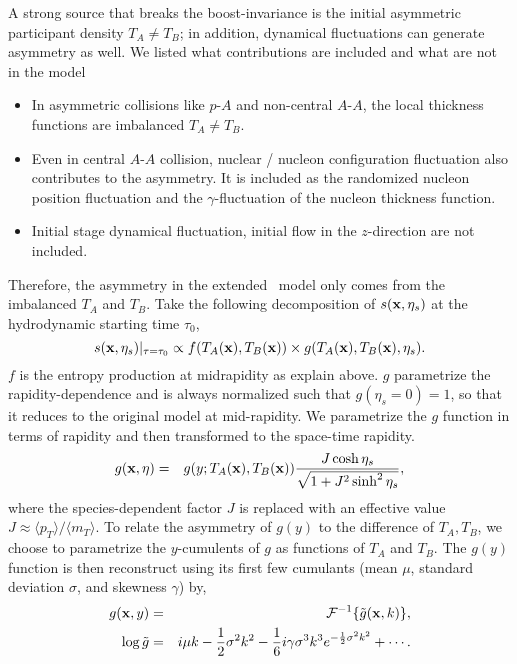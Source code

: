 A strong source that breaks the boost-invariance is the initial asymmetric participant density $T_A \neq T_B$; in addition, dynamical fluctuations can generate asymmetry as well.
We listed what contributions are included and what are not in the model
\begin{itemize}
\item In asymmetric collisions like $p$-$A$ and non-central $A$-$A$, the local thickness functions are imbalanced $T_A \neq T_B$.
\item Even in central $A$-$A$ collision, nuclear / nucleon configuration fluctuation also contributes to the asymmetry. It is included as the randomized nucleon position fluctuation and the $\gamma$-fluctuation of the nucleon thickness function.
\item Initial stage dynamical fluctuation, initial flow in the $z$-direction are not included.
\end{itemize}
Therefore, the asymmetry in the extended \trento\ model only comes from the imbalanced $T_A$ and $T_B$.
Take the following decomposition of $s(\mathbf x, \eta_s)$ at the hydrodynamic starting time $\tau_0$,
\begin{equation}
  s(\mathbf x, \eta_s)\vert_{\tau=\tau_0} \propto f(T_A(\mathbf x), T_B(\mathbf x)) \times g(T_A(\mathbf x), T_B(\mathbf x), \eta_s).
  \label{factorized}
\end{equation}
$f$ is the entropy production at midrapidity as explain above.
$g$ parametrize the rapidity-dependence and is always normalized such that $g(\eta_s=0)=1$, so that it reduces to the original model at mid-rapidity.
We parametrize the $g$ function in terms of rapidity and then transformed to the space-time rapidity.
\begin{eqnarray}
g(\mathbf x, \eta) &=& g(y; T_A(\mathbf x), T_B(\mathbf x)) \frac{J \cosh \eta_s}{\sqrt{1 + J^2 \sinh^2 \eta_s}},
\label{jacobian}
\end{eqnarray}
where the species-dependent factor $J$ is replaced with an effective value $J \approx \langle p_T \rangle / \langle m_T \rangle$.
To relate the asymmetry of $g(y)$ to the difference of $T_A, T_B$, we choose to parametrize the $y$-cumulents of $g$ as functions of $T_A$ and $T_B$.
The $g(y)$ function is then reconstruct using its first few cumulants (mean $\mu$, standard deviation $\sigma$, and skewness $\gamma$) by,
\begin{eqnarray}
g(\x, y) &=& \mathcal{F}^{-1}\{\tilde{g}(\x, k)\}, \\
\log \tilde{g} &=&  i \mu k - \frac{1}{2}\sigma^2 k^2 - \frac{1}{6} i \gamma \sigma^3 k^3  e^{-\frac{1}{2}\sigma^2 k^2} + \cdots \label{eq:cgf}.
\end{eqnarray}
